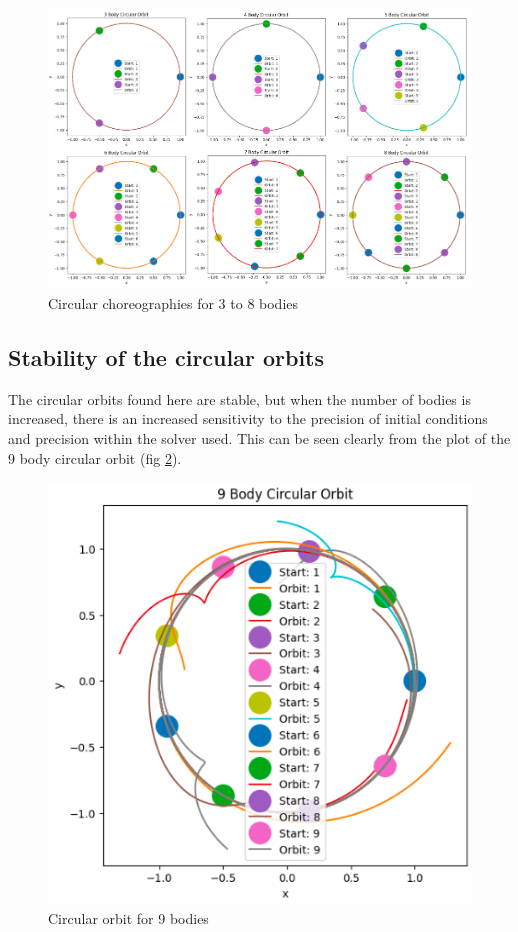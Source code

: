 \documentclass[11pt]{article}
\begin{document}
\begin{figure}[!ht]
\centerline{\includegraphics[scale=0.33]{Pictures/Circular_orbits.png}}
\caption{Circular choreographies for 3 to 8 bodies}
\label{Circ_3_8}
\end{figure}


\subsection{Stability of the circular orbits}

The circular orbits found here are stable, but when the number of bodies is increased, there is an increased sensitivity to the precision of initial conditions and precision within the solver used. This can be seen clearly from the plot of the 9 body circular orbit (fig \ref{Circ_9}).


\begin{figure}[!ht]
\centerline{\includegraphics[scale=0.35]{Pictures/9BodyCircular.png}}
\caption{Circular orbit for 9 bodies}
\label{Circ_9}
\end{figure}
\end{document}

